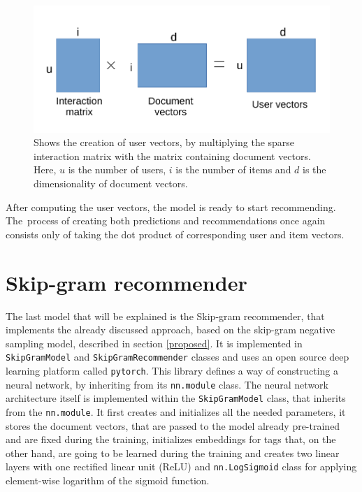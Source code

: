 \begin{figure}[H]
    \centering
    \includegraphics{obrazky-figures/user_vectors.pdf}
    \caption{Shows the creation of user vectors, by multiplying the sparse interaction matrix with the matrix containing document vectors. Here, $u$ is the number of users, $i$ is the number of items and $d$ is the dimensionality of document vectors.}
\end{figure}

After computing the user vectors, the model is ready to start recommending. The~process of creating both predictions and recommendations once again consists only of taking the dot product of corresponding user and item vectors.

\section{Skip-gram recommender} \label{skipgram_implementation}
The last model that will be explained is the Skip-gram recommender, that implements the already discussed approach, based on the skip-gram negative sampling model, described in section \ref{proposed}. It is implemented in \texttt{SkipGramModel} and \texttt{SkipGramRecommender} classes and uses an open source deep learning platform called \texttt{pytorch}.
This library defines a way of constructing a neural network, by inheriting from its \texttt{nn.module} class. The neural network architecture itself is implemented within the \texttt{SkipGramModel} class, that inherits from the \texttt{nn.module}. It first creates and initializes all the needed parameters, it stores the document vectors, that are passed to the model already pre-trained and are fixed during the training, initializes embeddings for tags that, on the other hand, are going to be learned during the training and creates two linear layers with one rectified linear unit (ReLU) and \texttt{nn.LogSigmoid} class for applying element-wise logarithm of the sigmoid function.

